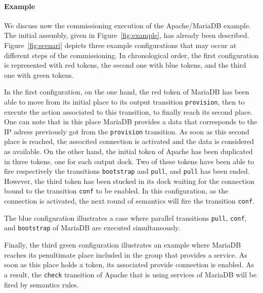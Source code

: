 \paragraph{Example}{
We discuss now the commissioning execution of the Apache/MariaDB
example.  The initial assembly, given in Figure~\ref{fig:example}, has
already been described. Figure~\ref{fig:scenari} depicts three example
configurations that may occur at different steps of the
commissioning. In chronological order, the first configuration is
represented with red tokens, the second one with blue tokens, and the
third one with green tokens.

In the first configuration, on the one hand, the red token of MariaDB
has been able to move from its initial place to its output transition
\texttt{provision}, then to execute the action associated to this
transition, to finally reach its second place. One can note that in
this place MariaDB provides a data that corresponds to the IP adress
previously got from the \texttt{provision} transition. As soon as this
second place is reached, the associted connection is activated and the
data is considered as available. On the other hand, the initial token
of Apache has been duplicated in three tokens, one for each output
dock. Two of these tokens have been able to fire respectively the
transitions \texttt{bootstrap} and \texttt{pull}, and \texttt{pull}
has been ended. However, the third token has been stucked in its dock
waiting for the connection bound to the transition \texttt{conf} to be
enabled. In this configuration, as the connection is activated, the
next round of semantics will fire the transition \texttt{conf}.

The blue configuration illustrates a case where parallel transitions
\texttt{pull}, \texttt{conf}, and \texttt{bootstrap} of MariaDB are
executed simultaneously.

Finally, the third green configuration illustrates an example where
MariaDB reaches its penultimate place included in the group that
provides a service. As soon as this place holds a token, its
associated provide connection is enabled. As a result, the
\texttt{check} transition of Apache that is using services of MariaDB
will be fired by semantics rules.}
